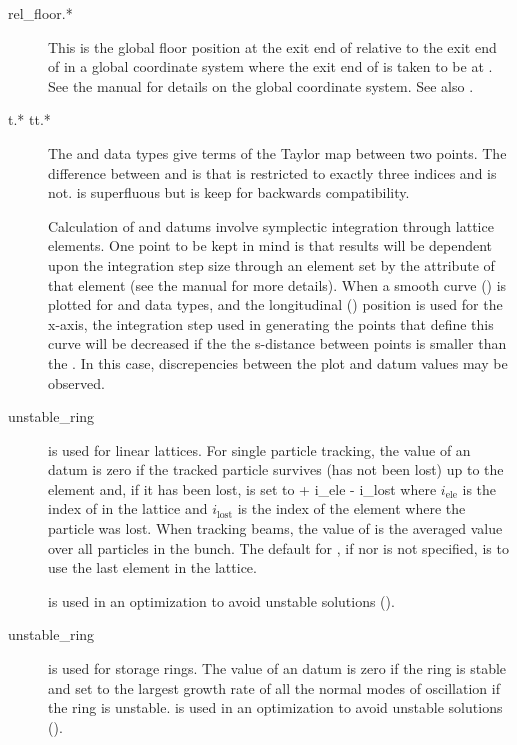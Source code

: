 \begin{description}
  \item[rel\_floor.*]
This is the global floor position at the exit end of  relative
to the exit end of  in a global coordinate system where the
exit end of  is taken to be at . See the \bmad manual for details on the global coordinate
system. See also .

  \item[t.* tt.*] \Newline
The  and  data types give terms of the Taylor map between
two points. The difference between  and  is that
 is restricted to exactly three indices and  is
not.  is superfluous but is keep for backwards compatibility.

Calculation of  and  datums involve symplectic integration
through lattice elements. One point to be kept in mind is that results
will be dependent upon the integration step size through an element
set by the  attribute of that element (see the \bmad
manual for more details). When a smooth curve () is
plotted for  and  data types, and the longitudinal
() position is used for the x-axis, the integration step used
in generating the points that define this curve will be decreased if
the the s-distance between points is smaller than the .
In this case, discrepencies between the plot and datum values may be observed.

  \item[unstable\_ring] \Newline
{} is used for linear lattices. For single particle
tracking, the value of an  datum is zero if the
tracked particle survives (has not been lost) up to the 
element and, if it has been lost, is set to 
 + i_{\mbox{ele}} - i_{\mbox{lost}}
\Endeq
where $i_{\mbox{ele}}$ is the index of  in the lattice and
$i_{\mbox{lost}}$ is the index of the element where the particle was
lost. When tracking beams, the value of  is the
averaged value over all particles in the bunch. The default for
, if  nor  is not specified, is to use
the last element in the lattice.

 is used in an optimization to avoid
unstable solutions ().

  \item[unstable\_ring] \Newline
{} is used for storage rings. The value of an
 datum is zero if the ring is stable and set to the
largest growth rate of all the normal modes of oscillation if the ring
is unstable.  is used in an optimization to avoid
unstable solutions ().


\end{description}
